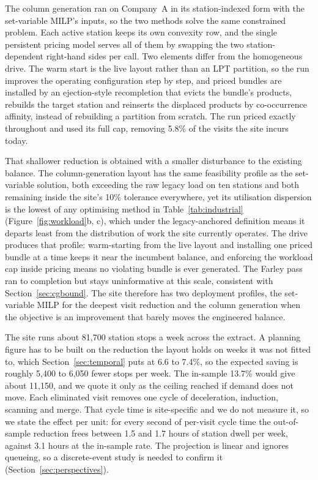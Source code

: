 \documentclass[]{interact}
\begin{document}
The column generation ran on Company~A in its station-indexed form with the set-variable MILP's inputs, so the two methods solve the same constrained problem. Each active station keeps its own convexity row, and the single persistent pricing model serves all of them by swapping the two station-dependent right-hand sides per call. Two elements differ from the homogeneous drive. The warm start is the live layout rather than an LPT partition, so the run improves the operating configuration step by step, and priced bundles are installed by an ejection-style recompletion that evicts the bundle's products, rebuilds the target station and reinserts the displaced products by co-occurrence affinity, instead of rebuilding a partition from scratch. The run priced exactly throughout and used its full cap, removing 5.8\% of the visits the site incurs today.

That shallower reduction is obtained with a smaller disturbance to the existing balance. The column-generation layout has the same feasibility profile as the set-variable solution, both exceeding the raw legacy load on ten stations and both remaining inside the site's 10\% tolerance everywhere, yet its utilisation dispersion is the lowest of any optimising method in Table~\ref{tab:industrial} (Figure~\ref{fig:workload}b, c), which under the legacy-anchored definition means it departs least from the distribution of work the site currently operates. The drive produces that profile: warm-starting from the live layout and installing one priced bundle at a time keeps it near the incumbent balance, and enforcing the workload cap inside pricing means no violating bundle is ever generated. The Farley pass ran to completion but stays uninformative at this scale, consistent with Section~\ref{sec:cgbound}. The site therefore has two deployment profiles, the set-variable MILP for the deepest visit reduction and the column generation when the objective is an improvement that barely moves the engineered balance.

The site runs about 81,700 station stops a week across the extract. A planning figure has to be built on the reduction the layout holds on weeks it was not fitted to, which Section~\ref{sec:temporal} puts at 6.6 to 7.4\%, so the expected saving is roughly 5,400 to 6,050 fewer stops per week. The in-sample 13.7\% would give about 11,150, and we quote it only as the ceiling reached if demand does not move. Each eliminated visit removes one cycle of deceleration, induction, scanning and merge. That cycle time is site-specific and we do not measure it, so we state the effect per unit: for every second of per-visit cycle time the out-of-sample reduction frees between 1.5 and 1.7 hours of station dwell per week, against 3.1 hours at the in-sample rate. The projection is linear and ignores queueing, so a discrete-event study is needed to confirm it (Section~\ref{sec:perspectives}).
\end{document}
